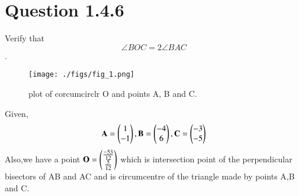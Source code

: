 \documentclass[journal,12pt,twocolumn]{IEEEtran}
\theoremstyle{remark}
\begin{document}
\section{Question 1.4.6}
Verify that$$\angle{BOC} = 2\angle{BAC}$$.
\fi
\begin{figure}
              \centering
              \texttt{[image: ./figs/fig\_1.png]}
              \caption{plot of corcumcirclr O and points A, B and C.}
              \label{fig:0}
\end{figure}

\solution
Given,$$\mathbf{A}=\begin{pmatrix}1\\-1\end{pmatrix}, 
\mathbf{B}=\begin{pmatrix}-4\\6\end{pmatrix}, 
\mathbf{C}=\begin{pmatrix}-3\\-5\end{pmatrix}$$
Also,we have a point $\mathbf{O}=\begin{pmatrix}\frac{-53}{12}\\\frac{5}{12}\end{pmatrix}$
which is intersection point of the perpendicular bisectors of AB and AC and is circumcentre of the triangle made by points A,B and C.
\end{document}
